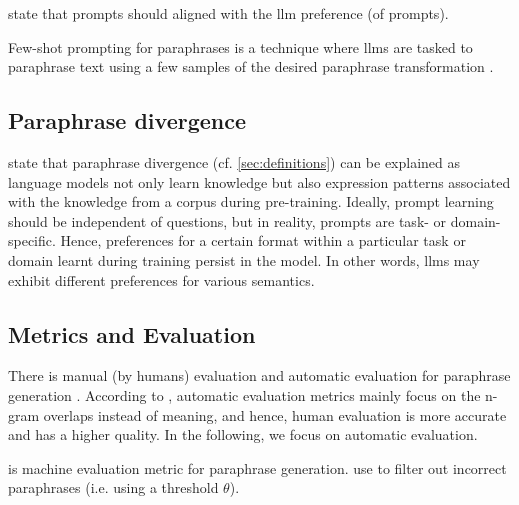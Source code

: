 \citet{zhou_paraphrase_2025} state that prompts should aligned with the \ac{llm} preference (of prompts).

Few-shot prompting for paraphrases is a technique where \acp{llm} are tasked to paraphrase text using a few samples of the desired paraphrase transformation \cite{zhou_paraphrase_2025}.


\subsection{Paraphrase divergence}
\citet{fu_learning_2024} state that paraphrase divergence (cf. \autoref{sec:definitions}) can be explained as language models 
not only learn knowledge but also expression patterns associated with the knowledge from a corpus during pre-training.
Ideally, prompt learning should be independent of questions, but in reality, prompts are task- or domain-specific.
Hence, preferences for a certain format within a particular task or domain learnt during training persist in the model.
In other words, \acp{llm} may exhibit different preferences for various semantics.


\subsection{Metrics and Evaluation}
There is manual (by humans) evaluation and automatic evaluation for paraphrase generation \cite{fu_learning_2024,zhou_paraphrase_2021}.
According to \citet{zhou_paraphrase_2021}, automatic evaluation metrics mainly focus on the n-gram overlaps instead of meaning, 
and hence, human evaluation is more accurate and has a higher quality.
In the following, we focus on automatic evaluation.

\bluert{} is machine evaluation metric for paraphrase generation.
\citet{fu_learning_2024} use \bluert{} to filter out incorrect paraphrases (i.e. using a threshold $\theta$).

